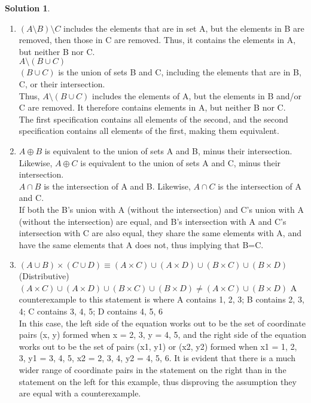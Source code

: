 \documentclass{article}
\theoremstyle{definition}
\newtheorem*{solution}{Solution}
\begin{document}
\begin{solution}
\end{solution}
\begin{enumerate}[label=\alph*)]
    \item
    $(A\setminus B) \setminus C$ includes the elements that are in set A, but the elements in B are removed, then those in C are removed. Thus, it contains the elements in A, but neither B nor C.\\
    $A\setminus (B\cup C)$\\
    $(B\cup C)$ is the union of sets B and C, including the elements that are in B, C, or their intersection.\\
    Thus,  $A\setminus (B\cup C)$ includes the elements of A, but the elements in B and/or C are removed. It therefore contains elements in A, but neither B nor C.\\
    The first specification contains all elements of the second, and the second specification contains all elements of the first, making them equivalent.
    
    \item 
    $A\oplus B$ is equivalent to the union of sets A and B, minus their intersection. Likewise, $A\oplus C$ is equivalent to the union of sets A and C, minus their intersection. \\
    $A\cap B$ is the intersection of A and B. Likewise, $A\cap C$ is the intersection of A and C. \\
    If both the B's union with A (without the intersection) and C's union with A (without the intersection) are equal, and B's intersection with A and C's intersection with C are also equal, they share the same elements with A,  and have the same elements that A does not, thus implying that B=C.
    
    \item
       $(A\cup B) \times (C \cup D) \equiv (A \times C) \cup (A \times D) \cup (B \times C) \cup (B \times D)$ (Distributive)\\
       $(A \times C) \cup (A \times D) \cup (B \times C) \cup (B \times D) \neq (A\times C) \cup (B\times D)$
       A counterexample to this statement is where A contains 1, 2, 3; B contains 2, 3, 4; C contains 3, 4, 5; D contains 4, 5, 6\\
       In this case, the left side of the equation works out to be the set of coordinate pairs (x, y) formed when x = {2, 3}, y = {4, 5}, and the right side of the equation works out to be the set of pairs (x1, y1) or (x2, y2) formed when x1 = {1, 2, 3}, y1 = {3, 4, 5}, x2 = {2, 3, 4}, y2 = {4, 5, 6}. It is evident that there is a much wider range of coordinate pairs in the statement on the right than in the statement on the left for this example, thus disproving the assumption they are equal with a counterexample.
\end{enumerate}
\end{document}
